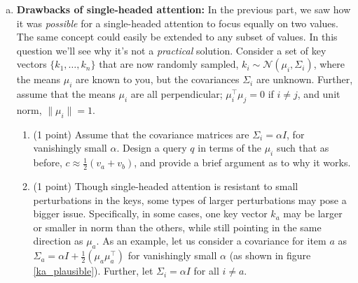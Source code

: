 \begin{enumerate}[(a)]
\begin{answer}
\end{answer}


\item {}  \textbf{Drawbacks of single-headed attention:} \label{q_problem_with_single_head}
In the previous part, we saw how it was \textit{possible} for a single-headed attention to focus equally on two values.
The same concept could easily be extended to any subset of values.
In this question we'll see why it's not a \textit{practical} solution.
Consider a set of key vectors $\{k_1,\dots,k_n\}$ that are now randomly sampled, $k_i\sim \mathcal{N}(\mu_i, \Sigma_i)$, where the means $\mu_i$ are known to you, but the covariances $\Sigma_i$ are unknown.
Further, assume that the means $\mu_i$ are all perpendicular; $\mu_i^\top \mu_j = 0$ if $i\not=j$, and unit norm, $\|\mu_i\|=1$.

    \begin{enumerate}[label=\roman*.]
    \item (1 point) Assume that the covariance matrices are $\Sigma_i = \alpha I$, for vanishingly small $\alpha$.
    Design a query $q$ in terms of the $\mu_i$ such that as before, $c\approx \frac{1}{2}(v_a + v_b)$, and provide a brief argument as to why it works.

    \begin{answer}
    \end{answer}


    \item (1 point) Though single-headed attention is resistant to small perturbations in the keys, some types of larger perturbations may pose a bigger issue. Specifically, in some cases, one key vector $k_a$ may be larger or smaller in norm than the others, while still pointing in the same direction as $\mu_a$. As an example, let us consider a covariance for item $a$ as $\Sigma_a = \alpha I + \frac{1}{2}(\mu_a\mu_a^\top)$ for vanishingly small $\alpha$ (as shown in figure \ref{ka_plausible}).
    Further, let $\Sigma_i = \alpha I$ for all $i \neq a$. %


\end{enumerate}
\end{enumerate}
